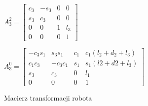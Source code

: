 \begin{figure}[H]
\centering

$A^2_3=
\begin{bmatrix}
c_3 & -s_3 & 0 & 0 \\
s_3 & c_3 & 0 & 0 \\
0 & 0 & 1 & l_3 \\
0 & 0 & 0 & 1 
\end{bmatrix}  $
\end{figure} 


\begin{figure}[H]
\centering

$A^0_3=
\begin{bmatrix}
-c_{3}s_{1}& s_{3}s_{1} & c_1 & c_{1}(l_2+d_2+l_3) \\
c_{1}c_{3} & -c_{3}c_{1} & s_1 & s_{1}(l2+d2+l_3) \\
s_3 & c_3 & 0 & l_1\\
0 & 0 & 0 & 1 
\end{bmatrix}  $
\caption{Macierz transformacji robota} 
\end{figure} 